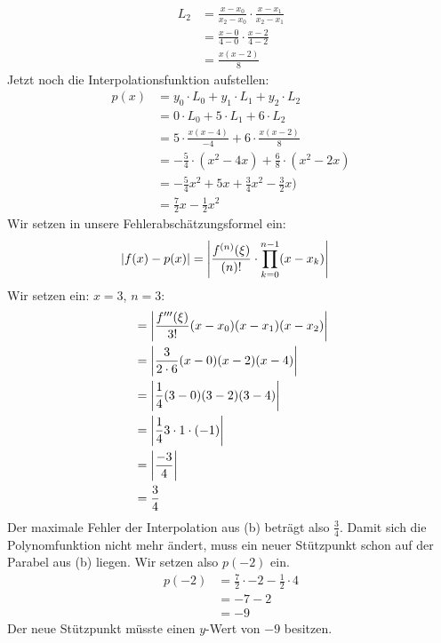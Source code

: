 {\begin{align*}
			L_2 &= \frac{x-x_0}{x_2-x_0} \cdot \frac{x-x_1}{x_2-x_1} \\
				&= \frac{x-0}{4-0} \cdot \frac{x-2}{4-2} \\
				&= \frac{x(x-2)}{8}
		\end{align*}
		Jetzt noch die Interpolationsfunktion aufstellen:
		\begin{align*}
			p(x) &= y_0 \cdot L_0 + y_1 \cdot L_1 + y_2 \cdot L_2 \\
				&= 0 \cdot L_0 + 5 \cdot L_1 + 6 \cdot L_2 \\
				&= 5 \cdot \frac{x(x-4)}{-4} + 6 \cdot \frac{x(x-2)}{8} \\
				&= -\frac{5}{4} \cdot (x^2-4x) + \frac{6}{8} \cdot (x^2-2x) \\
				&= -\frac{5}{4}x^2 + 5x + \frac{3}{4}x^2 - \frac{3}{2}x) \\
				&= \frac{7}{2}x - \frac{1}{2}x^2
		\end{align*}
		\itemf Wir setzen in unsere Fehlerabschätzungsformel ein:
		\begin{align*}
			\abs{f(x) - p(x)} &= \abs{\frac{f^{(n)}(\xi)}{(n)!} \cdot \prod_{k=0}^{n-1}(x-x_k)}
		\end{align*}
		Wir setzen ein: $x=3$, $n=3$:
		\begin{align*}
			&= \abs{\frac{f'''(\xi)}{3!}(x-x_0)(x-x_1)(x-x_2)} \\
			&= \abs{\frac{3}{2 \cdot 6}(x-0)(x-2)(x-4)} \\
			&= \abs{\frac{1}{4}(3-0)(3-2)(3-4)} \\
			&= \abs{\frac{1}{4}3 \cdot 1 \cdot (-1)} \\
			&= \abs{\frac{-3}{4}} \\
			&= \frac{3}{4}
		\end{align*}
		Der maximale Fehler der Interpolation aus (b) beträgt also $\frac{3}{4}$.
		\itemf Damit sich die Polynomfunktion nicht mehr ändert, muss ein neuer Stützpunkt schon auf der Parabel aus (b) liegen. Wir setzen also $p(-2)$ ein.
		\begin{align*}
			p(-2) &= \frac{7}{2}\cdot -2 - \frac{1}{2} \cdot 4 \\
				&= -7 - 2 \\
				&= -9
		\end{align*}
		Der neue Stützpunkt müsste einen $y$-Wert von $-9$ besitzen.
}